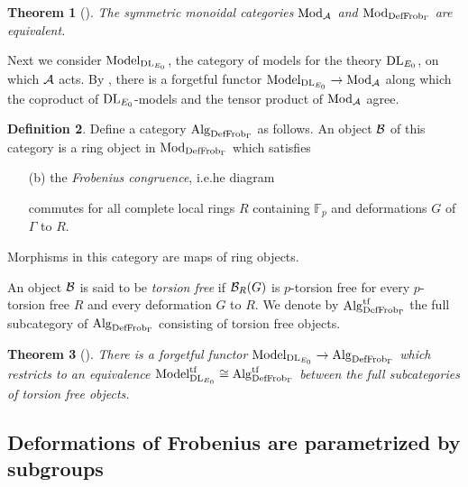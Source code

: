\documentclass{gtpart}
\newtheorem{thm}{Theorem}
\theoremstyle{definition}
\newtheorem{defn}[thm]{Definition}
\theoremstyle{remark}
\newcommand{\mb}[1]{\mathbb{#1}}
\newcommand{\DL}{{\rm DL}}
\newcommand{\CA}{{\cal A}}
\newcommand{\Mod}{{\rm Mod}}
\newcommand{\Alg}{{\rm Alg}}
\newcommand{\Frob}{{\rm Frob}}
\newcommand{\DF}{{{\rm DefFrob}_\Gamma}}
\newcommand{\Model}{{\rm Model}}
\begin{document}
\begin{thm}[{\cite[pre-theorem 16.4]{lpo}}]
 The symmetric monoidal categories $\Mod_\CA$ and $\Mod_\DF$ are 
 equivalent.  
\end{thm}

Next we consider $\Model_{\DL_{E_0}}$, the category of models for the 
theory $\DL_{E_0}$, on which $\CA$ acts.  By \cite[proposition 7.6]{lpo}, there is a forgetful functor 
$\Model_{\DL_{E_0}} \to \Mod_\CA$ along which the coproduct of 
$\DL_{E_0}$-models and the tensor product of $\Mod_\CA$ agree.  
\begin{defn}
\label{def:alg}
 Define a category $\Alg_\DF$ as follows.  An object $\cal B$ of this 
 category is a ring object in $\Mod_\DF$ which satisfies
 \begin{enumerate}
  \item[(b)] the {\em Frobenius congruence}, i.e.he diagram
  \begin{center}
  \end{center}
  commutes for all complete local rings $R$ containing ${\mb F}_p$ and 
  deformations $G$ of $\Gamma$ to $R$.  
 \end{enumerate}
 Morphisms in this category are maps of ring objects.  

 An object ${\cal B}$ is said to be {\em torsion free} if 
 ${\cal B}_R(G)$ is $p$-torsion free for every $p$-torsion free $R$ and 
 every deformation $G$ to $R$.  We denote by $\Alg_\DF^{\rm tf}$ the full subcategory of $\Alg_\DF$ consisting of torsion free objects.
\end{defn}

\begin{thm}[{\cite[pre-theorem 16.5]{lpo}}]
 There is a forgetful functor $\Model_{\DL_{E_0}} \to \Alg_\DF$ which 
 restricts to an equivalence $\Model_{\DL_{E_0}}^{\rm tf} \cong \Alg_\DF^{\rm tf}$ between the full subcategories of torsion 
 free objects.
\end{thm}


\subsection{Deformations of Frobenius are parametrized by subgroups}
\label{subsec:subgp}
\end{document}
